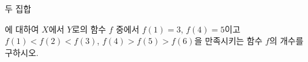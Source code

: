 두 집합 \par\smallskip{}\par\smallskip\noindent 에 대하여 $X$에서 $Y$로의 함수 $f$ 중에서 $f(1)=3$, $f(4)=5$이고 $f(1)<f(2)<f(3)$, $f(4)>f(5)>f(6)$을 만족시키는 함수 $f$의 개수를 구하시오.
